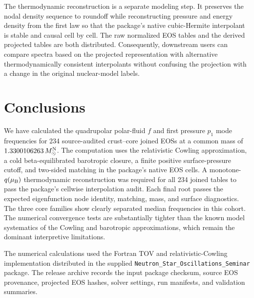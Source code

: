 \documentclass[aps,prd,twocolumn,superscriptaddress,nofootinbib]{revtex4-2}
\newcommand{\MsunN}{M_{\odot}^{\rm N}}
\newcommand{\mub}{\mu_{\rm B}}
\begin{document}
The thermodynamic reconstruction is a separate modeling step. It preserves the nodal density sequence to roundoff while reconstructing pressure and energy density from the first law so that the package's native cubic-Hermite interpolant is stable and causal cell by cell. The raw normalized EOS tables and the derived projected tables are both distributed. Consequently, downstream users can compare spectra based on the projected representation with alternative thermodynamically consistent interpolants without confusing the projection with a change in the original nuclear-model labels.

\section{Conclusions}

We have calculated the quadrupolar polar-fluid $f$ and first pressure $p_1$ mode frequencies for 234 source-audited crust--core joined EOSs at a common mass of $1.3300106263\,\MsunN$. The computation uses the relativistic Cowling approximation, a cold beta-equilibrated barotropic closure, a finite positive surface-pressure cutoff, and two-sided matching in the package's native EOS cells. A monotone-$q(\mub)$ thermodynamic reconstruction was required for all 234 joined tables to pass the package's cellwise interpolation audit. Each final root passes the expected eigenfunction node identity, matching, mass, and surface diagnostics. The three core families show clearly separated median frequencies in this cohort. The numerical convergence tests are substantially tighter than the known model systematics of the Cowling and barotropic approximations, which remain the dominant interpretive limitations.

\begin{acknowledgments}
The numerical calculations used the Fortran TOV and relativistic-Cowling implementation distributed in the supplied \texttt{Neutron\_Star\_Oscillations\_Seminar} package. The release archive records the input package checksum, source EOS provenance, projected EOS hashes, solver settings, run manifests, and validation summaries.
\end{acknowledgments}



\end{document}
